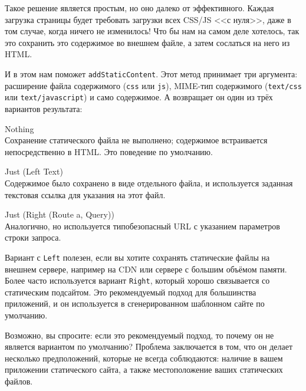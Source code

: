 Такое решение является простым, но оно далеко от эффективного. Каждая загрузка страницы будет требовать загрузки всех CSS/JS <<с нуля>>, даже в том случае, когда ничего не изменилось! Что бы нам на самом деле хотелось, так это сохранить это содержимое во внешнем файле, а затем сослаться на него из HTML.

И в этом нам поможет \lstinline!addStaticContent!. Этот метод принимает три аргумента: расширение файла содержимого (\lstinline!css! или \lstinline!js!), MIME-тип содержимого (\lstinline!text/css! или \lstinline!text/javascript!) и само содержимое. А возвращает он один из трёх вариантов результата:

\begin{description}
  \item {Nothing}  \hfill \\
    Сохранение статического файла не выполнено; содержимое встраивается непосредственно в HTML. Это поведение по умолчанию.
  \item {Just (Left Text)} \hfill \\
    Содержимое было сохранено в виде отдельного файла, и используется заданная текстовая ссылка для указания на этот файл.
  \item {Just (Right (Route a, Query))} \hfill \\
    Аналогично, но используется типобезопасный URL с указанием параметров строки запроса.
\end{description}

Вариант с \lstinline!Left! полезен, если вы хотите сохранять статические файлы на внешнем сервере, например на CDN или сервере с большим объёмом памяти. Более часто используется вариант \lstinline!Right!, который хорошо связывается со статическим подсайтом. Это рекомендуемый подход для большинства приложений, и он используется в сгенерированном шаблонном сайте по умолчанию.

\begin{remark}
Возможно, вы спросите: если это рекомендуемый подход, то почему он не является вариантом по умолчанию? Проблема заключается в том, что он делает несколько предположений, которые не всегда соблюдаются: наличие в вашем приложении статического сайта, а также местоположение ваших статических файлов.
\end{remark}

